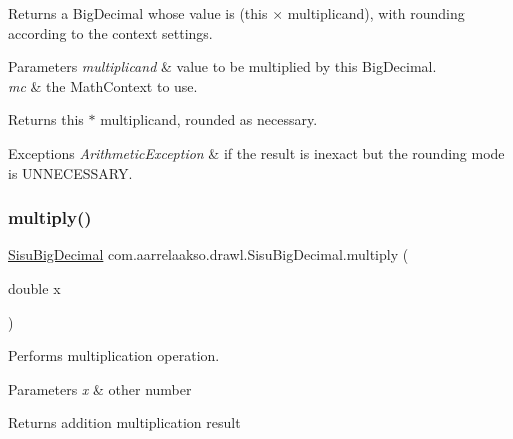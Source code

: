Returns a Big\+Decimal whose value is (this × multiplicand), with rounding according to the context settings. 


\begin{DoxyParams}{Parameters}
{\em multiplicand} & value to be multiplied by this Big\+Decimal. \\
\hline
{\em mc} & the Math\+Context to use. \\
\hline
\end{DoxyParams}
\begin{DoxyReturn}{Returns}
this $\ast$ multiplicand, rounded as necessary. 
\end{DoxyReturn}

\begin{DoxyExceptions}{Exceptions}
{\em Arithmetic\+Exception} & if the result is inexact but the rounding mode is U\+N\+N\+E\+C\+E\+S\+S\+A\+RY. \\
\hline
\end{DoxyExceptions}
\mbox{\label{classcom_1_1aarrelaakso_1_1drawl_1_1_sisu_big_decimal_a629f43082e518f55326ca0efcffad3b5}} 
\subsubsection{\texorpdfstring{multiply()}{multiply()}\hspace{0.1cm}{\footnotesize\ttfamily [3/3]}}
{\footnotesize\ttfamily \hyperlink{classcom_1_1aarrelaakso_1_1drawl_1_1_sisu_big_decimal}{Sisu\+Big\+Decimal} com.\+aarrelaakso.\+drawl.\+Sisu\+Big\+Decimal.\+multiply (\begin{DoxyParamCaption}\item[{double}]{x }\end{DoxyParamCaption})\hspace{0.3cm}{\ttfamily [protected]}}



Performs multiplication operation. 


\begin{DoxyParams}{Parameters}
{\em x} & other number \\
\hline
\end{DoxyParams}
\begin{DoxyReturn}{Returns}
addition multiplication result 
\end{DoxyReturn}
\mbox{\label{classcom_1_1aarrelaakso_1_1drawl_1_1_sisu_big_decimal_a2d82668c01a8ec2b0b79c2a6cd63253c}} 
